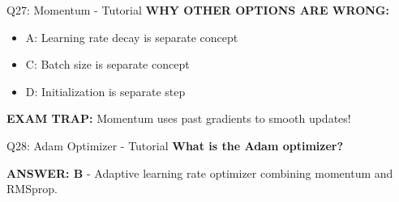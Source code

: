 \documentclass[8pt]{beamer}
\begin{document}
\begin{frame}{Q27: Momentum - Tutorial}
		\vspace{0.05cm}
		\textcolor{myred}{\textbf{WHY OTHER OPTIONS ARE WRONG:}}
		\begin{itemize}
			\item \textcolor{myred}{A:} Learning rate decay is separate concept
			\item \textcolor{myred}{C:} Batch size is separate concept
			\item \textcolor{myred}{D:} Initialization is separate step
		\end{itemize}
		
		\textcolor{myred}{\textbf{EXAM TRAP:}} Momentum uses \textcolor{myblue}{past gradients} to smooth updates!
	\end{frame}
	
	\begin{frame}{Q28: Adam Optimizer - Tutorial}
		\fontsize{6.5}{7.5}\selectfont
		\textbf{What is the Adam optimizer?}
		
		\vspace{0.05cm}
		\textcolor{myblue}{\textbf{ANSWER: B}} - Adaptive learning rate optimizer combining momentum and RMSprop.
		

\end{frame}
\end{document}

